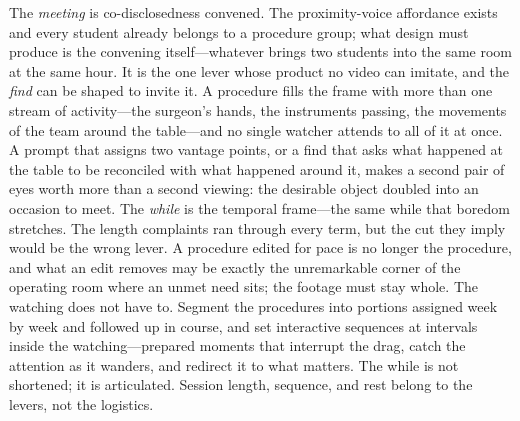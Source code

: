 The \textit{meeting} is co-disclosedness convened. The proximity-voice
affordance exists and every student already belongs to a procedure
group; what design must produce is the convening itself---whatever
brings two students into the same room at the same hour. It is the one
lever whose product no video can imitate, and the \textit{find} can be
shaped to invite it. A procedure fills the frame with more than one
stream of activity---the surgeon's hands, the instruments passing, the
movements of the team around the table---and no single watcher attends
to all of it at once. A prompt that assigns two vantage points, or a
find that asks what happened at the table to be reconciled with what
happened around it, makes a second pair of eyes worth more than a
second viewing: the desirable object doubled into an occasion to meet.
The \textit{while} is the temporal frame---the same while that boredom
stretches. The length complaints ran through every term, but the cut
they imply would be the wrong lever. A procedure edited for pace is no
longer the procedure, and what an edit removes may be exactly the
unremarkable corner of the operating room where an unmet need sits;
the footage must stay whole. The watching does not have to. Segment
the procedures into portions assigned week by week and followed up in
course, and set interactive sequences at intervals inside the
watching---prepared moments that interrupt the drag, catch the
attention as it wanders, and redirect it to what matters. The while is
not shortened; it is articulated. Session length, sequence, and rest
belong to the levers, not the logistics.

